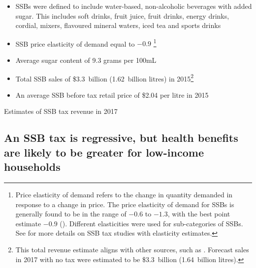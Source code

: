 \documentclass[embargoed]{grattan}
\begin{document}
\begin{itemize}
\item
  SSBs were defined to include water-based, non-alcoholic beverages with added sugar.
This includes soft drinks, fruit juice, fruit drinks, energy drinks, cordial, mixers, flavoured mineral waters, iced tea and sports drinks
\item
  SSB price elasticity of demand equal to \(-0.9\)%
\footnote{Price elasticity of demand refers to the change in quantity demanded in response to a change in price.
The price elasticity of demand for SSBs is generally found to be in the range of \(-0.6\) to \(-1.3\), with the best point estimate \(-0.9\) (\textcites{Andreyeva2010impactfoodprices}{Block2010Pointpurchaseprice}{Sharma2014effectstaxingsugarsweetened}{Yang2016child}{Lineffectssugarsweetened}{Powell2013Assessingpotentialeffectiveness}{Bahl2003uneasycasediscriminatory}{Miao2013Accountingproductsubstitution}{Escobar2013Evidencethattax}).
Different elasticities were used for sub-categories of SSBs.
See  for more details on SSB tax studies with elasticity estimates.}
\item
  Average sugar content of 9.3 grams per 100mL
\item
  Total SSB sales of \$3.3~billion (1.62~billion litres) in 2015\footnote{This total revenue estimate aligns with other sources, such as \textcite{Levy2014QuenchingAustraliasthirst}.
Forecast sales in 2017 with no tax were estimated to be \$3.3~billion (1.64~billion litres).}
\item
  An average SSB before tax retail price of \$2.04 per litre in 2015
\end{itemize}

\begin{table}
\caption{Estimates of SSB tax revenue in 2017}\label{tbl:Estimates-of-SSB-tax-revenue-2017}




\end{table}

\subsection{An SSB tax is regressive, but health benefits are likely to be greater for low-income households}\label{an-ssb-tax-is-regressive-but-health-benefits-are-likely-to-be-greater-for-low-income-households}
\end{document}
